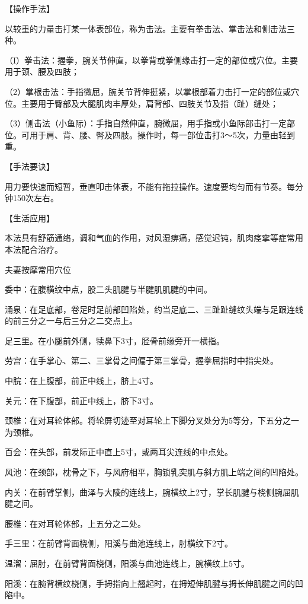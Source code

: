 \documentclass[12pt,UTF8]{ctexbook}
\begin{document}
【操作手法】

以较重的力量击打某一体表部位，称为击法。主要有拳击法、掌击法和侧击法三种。

（I）拳击法：握拳，腕关节伸直，以拳背或拳侧缘击打一定的部位或穴位。主要用于颈、腰及四肢；

（2）掌根击法：手指微屈，腕关节背伸挺紧，以掌根部着力击打一定的部位或穴位。主要用于臀部及大腿肌肉丰厚处，肩背部、四肢关节及指（趾）缝处；

（3）侧击法（小鱼际）：手指自然伸直，腕微屈，用手指或小鱼际部击打一定部位。可用于肩、背、腰、臀及四肢。操作时，每一部位击打3～5次，力量由轻到重。

【手法要诀】

用力要快速而短暂，垂直叩击体表，不能有拖拉操作。速度要均匀而有节奏。每分钟150次左右。

【生活应用】

本法具有舒筋通络，调和气血的作用，对风湿痹痛，感觉迟钝，肌肉痉挛等症常用本法配合治疗。





夫妻按摩常用穴位


委中：在腹横纹中点，股二头肌腱与半腱肌肌腱的中间。

涌泉：在足底部，卷足时足前部凹陷处，约当足底二、三趾趾缝纹头端与足跟连线的前三分之一与后三分之二交点上。

足三里。在小腿前外侧，犊鼻下3寸，胫骨前缘旁开一横指。

劳宫：在手掌心、第二、三掌骨之间偏于第三掌骨，握拳屈指时中指尖处。

中脘：在上腹部，前正中线上，脐上4寸。

关元：在下腹部，前正中线上，脐下3寸。

颈椎：在对耳轮体部。将轮屏切迹至对耳轮上下脚分叉处分为5等分，下五分之一为颈椎。

百会：在头部，前发际正中直上5寸，或两耳尖连线的中点处。

风池：在颈部，枕骨之下，与风府相平，胸锁乳突肌与斜方肌上端之间的凹陷处。

内关：在前臂掌侧，曲泽与大陵的连线上，腕横纹上2寸，掌长肌腱与桡侧腕屈肌腱之间。

腰椎：在对耳轮体部，上五分之二处。

手三里：在前臂背面桡侧，阳溪与曲池连线上，肘横纹下2寸。

温溜：屈肘，在前臂背面桡侧，阳溪与曲池连线上，腕横纹上5寸。

阳溪：在腕背横纹桡侧，手拇指向上翘起时，在拇短伸肌腱与拇长伸肌腱之间的凹陷中。
\end{document}
